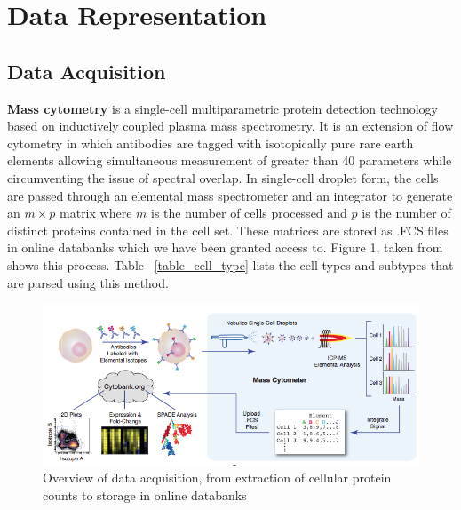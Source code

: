 \documentclass{article}
\begin{document}
\section{Data Representation}
\label{data_representation}

\subsection{Data Acquisition}

\textbf{Mass cytometry} is a single-cell multiparametric protein detection technology based on inductively coupled plasma mass spectrometry. It is an extension of flow cytometry in which antibodies are tagged with isotopically pure rare earth elements allowing simultaneous measurement of greater than 40 parameters while circumventing the issue of spectral overlap. In single-cell droplet form, the cells are passed through an elemental mass spectrometer and an integrator to generate an $m \times p$ matrix where $m$ is the number of cells processed and $p$ is the number of distinct proteins contained in the cell set. These matrices are stored as .FCS files in online databanks which we have been granted access to. Figure 1, taken from \cite{Bendall:2011bm} shows this process. Table ~\ref{table_cell_type} lists the cell types and subtypes that are parsed using this method.

\begin{figure}
\vskip 0.2in
\begin{center}
\centerline{\includegraphics[width=\columnwidth]{DataAcquisition}}
\caption{Overview of data acquisition, from extraction of cellular protein counts to storage in online databanks}
\end{center}
\label{dataacquisition}
\vskip -0.2in
\end{figure}  
\end{document}
